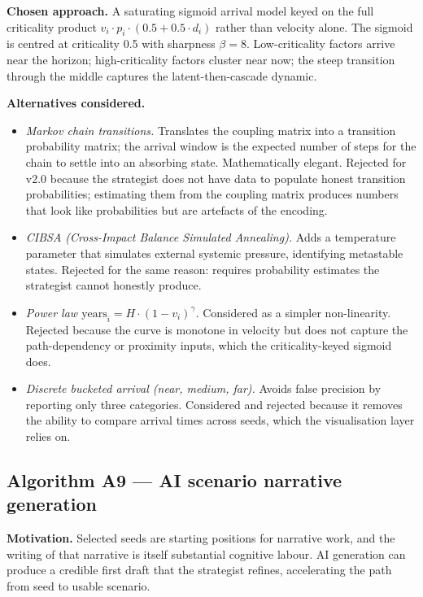 \documentclass[11pt,a4paper]{article}
\begin{document}
\textbf{Chosen approach.} A saturating sigmoid arrival model keyed on the full criticality product $v_i \cdot p_i \cdot (0.5 + 0.5 \cdot d_i)$ rather than velocity alone. The sigmoid is centred at criticality 0.5 with sharpness $\beta = 8$. Low-criticality factors arrive near the horizon; high-criticality factors cluster near now; the steep transition through the middle captures the latent-then-cascade dynamic.

\textbf{Alternatives considered.}

\begin{itemize}[leftmargin=*]
  \item \emph{Markov chain transitions.} Translates the coupling matrix into a transition probability matrix; the arrival window is the expected number of steps for the chain to settle into an absorbing state. Mathematically elegant. Rejected for v2.0 because the strategist does not have data to populate honest transition probabilities; estimating them from the coupling matrix produces numbers that look like probabilities but are artefacts of the encoding.
  \item \emph{CIBSA (Cross-Impact Balance Simulated Annealing).} Adds a temperature parameter that simulates external systemic pressure, identifying metastable states. Rejected for the same reason: requires probability estimates the strategist cannot honestly produce.
  \item \emph{Power law $\text{years}_i = H \cdot (1 - v_i)^\gamma$.} Considered as a simpler non-linearity. Rejected because the curve is monotone in velocity but does not capture the path-dependency or proximity inputs, which the criticality-keyed sigmoid does.
  \item \emph{Discrete bucketed arrival (near, medium, far).} Avoids false precision by reporting only three categories. Considered and rejected because it removes the ability to compare arrival times across seeds, which the visualisation layer relies on.
\end{itemize}

\subsection{Algorithm A9 — AI scenario narrative generation}

\textbf{Motivation.} Selected seeds are starting positions for narrative work, and the writing of that narrative is itself substantial cognitive labour. AI generation can produce a credible first draft that the strategist refines, accelerating the path from seed to usable scenario.
\end{document}
